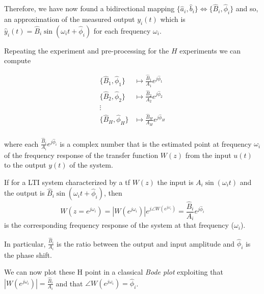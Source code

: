 Therefore, we have now found a bidirectional mapping $ \{ \hat{a}_i, \hat{b}_i \} \iff \{ \hat{B}_i, \hat{\phi}_i \}$ and so, an approximation of the measured output $y_i(t)$ which is $\hat{y}_i(t) = \hat{B}_i\sin(\omega_it + \hat{\phi}_i)$ for each frequency $\omega_i$. 

Repeating the experiment and pre-processing for the $H$ experiments we can compute 

\begin{align*}
    \{ \hat{B}_1, \hat{\phi}_1 \} &\mapsto \frac{\hat{B}_1}{A_1} e^{j\hat{\phi}_1} \\
    \{ \hat{B}_2, \hat{\phi}_2 \} &\mapsto \frac{\hat{B}_2}{A_2} e^{j\hat{\phi}_2} \\
    \vdots& \\
    \{ \hat{B}_H, \hat{\phi}_H \} &\mapsto \frac{\hat{B}_H}{A_H} e^{j\hat{\phi}_H} \\
\end{align*}

where each $\frac{\hat{B}_i}{A_i} e^{j\hat{\phi}_i}$ is a complex number that is the estimated point at frequency $\omega_i$ of the frequency response of the transfer function $W(z)$ from the input $u(t)$ to the output $y(t)$ of the system.

\begin{recall}
    If for a LTI system characterized by a \gls{tf} $W(z)$ the input is $A_i \sin (\omega_i t)$ and the output is $\hat{B}_i \sin (\omega_i t + \hat{\phi}_i)$, then 
    \[ W(z=e^{j \omega_i}) = |W(e^{j \omega_i})| e^{j \angle W(e^{j \omega_i})} = \frac{\hat{B}_i}{A_i} e^{j\hat{\phi}_i} \]
     is the corresponding frequency response of the system at that frequency ($\omega_i$).
    
    In particular, $\frac{\hat{B}_i}{A_i}$ is the ratio between the output and input amplitude and $\hat{\phi}_i$ is the phase shift.
\end{recall}

We can now plot these H point in a classical \emph{Bode plot} exploiting that $|W(e^{j \omega_i})| = \frac{\hat{B}_i}{A_i}$ and that $\angle W(e^{j \omega_i}) = \hat{\phi}_i$.

\begin{figure}[H]
    \centering
\end{figure}

